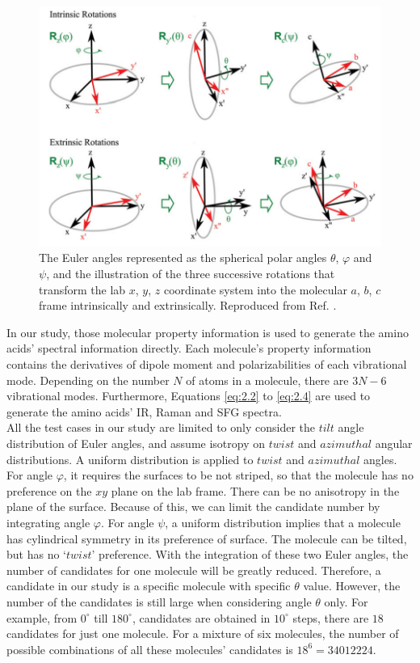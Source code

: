 \begin{figure}[!ht] 
\centering
\includegraphics[scale=0.5]{Figures/Euler_angles_represented_as_the_spherical_polar_angles.png} 
\caption{The Euler angles represented as the spherical polar angles $\theta$, $\varphi$ and $\psi$, and the illustration of the three successive rotations that transform the lab $x$, $y$, $z$ coordinate system into the molecular $a$, $b$, $c$ frame intrinsically and extrinsically. Reproduced from Ref. . }
\label{fig:2.1}
\end{figure}

In our study, those molecular property information is used to generate the amino acids' spectral information directly. Each molecule's property information contains the derivatives of dipole moment and polarizabilities of each vibrational mode. Depending on the number $N$ of atoms in a molecule, there are $3N-6$ vibrational modes. Furthermore, Equations \ref{eq:2.2} to \ref{eq:2.4} are used to generate the amino acids' IR, Raman and SFG spectra. \\

All the test cases in our study are limited to only consider the $tilt$ angle distribution of Euler angles, and assume isotropy on $twist$ and $azimuthal$ angular distributions. A uniform distribution is applied to $twist$ and $azimuthal$ angles. For angle $\varphi$, it requires the surfaces to be not striped, so that the molecule has no preference on the $xy$ plane on the lab frame. There can be no anisotropy in the plane of the surface. Because of this, we can limit the candidate number by integrating angle $\varphi$. For angle $\psi$, a uniform distribution implies that a molecule has cylindrical symmetry in its preference of surface. The molecule can be tilted, but has no `$twist$' preference. With the integration of these two Euler angles, the number of candidates for one molecule will be greatly reduced. Therefore, a candidate in our study is a specific molecule with specific $\theta$ value. However, the number of the candidates is still large when considering angle $\theta$ only. For example, from $0^{\circ}$ till $180^{\circ}$, candidates are obtained in $10^{\circ}$ steps, there are $18$ candidates for just one molecule. For a mixture of six molecules, the number of possible combinations of all these molecules' candidates is $18^{6} = 34012224$. \\

